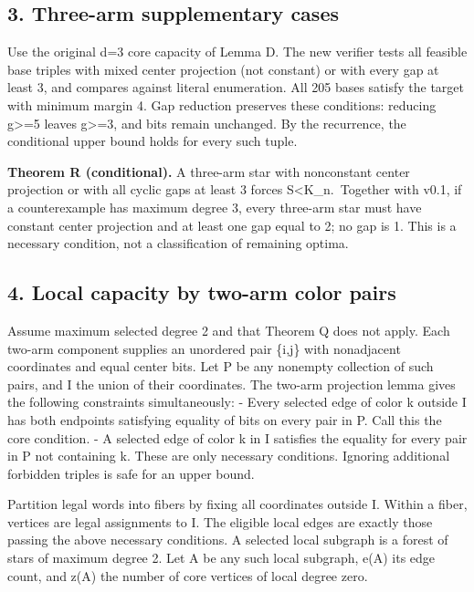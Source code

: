 \documentclass[
  10pt,
]{article}
\begin{document}
\subsection{3. Three-arm supplementary
cases}\label{three-arm-supplementary-cases}

Use the original d=3 core capacity of Lemma D. The new verifier tests
all feasible base triples with mixed center projection (not constant) or
with every gap at least 3, and compares against literal enumeration. All
205 bases satisfy the target with minimum margin 4. Gap reduction
preserves these conditions: reducing g\textgreater=5 leaves
g\textgreater=3, and bits remain unchanged. By the recurrence, the
conditional upper bound holds for every such tuple.

\textbf{Theorem R (conditional).} A three-arm star with nonconstant
center projection or with all cyclic gaps at least 3 forces
\textbar S\textbar\textless K\_n.~Together with v0.1, if a
counterexample has maximum degree 3, every three-arm star must have
constant center projection and at least one gap equal to 2; no gap is 1.
This is a necessary condition, not a classification of remaining optima.

\subsection{4. Local capacity by two-arm color
pairs}\label{local-capacity-by-two-arm-color-pairs}

Assume maximum selected degree 2 and that Theorem Q does not apply. Each
two-arm component supplies an unordered pair \{i,j\} with nonadjacent
coordinates and equal center bits. Let P be any nonempty collection of
such pairs, and I the union of their coordinates. The two-arm projection
lemma gives the following constraints simultaneously: - Every selected
edge of color k outside I has both endpoints satisfying equality of bits
on every pair in P. Call this the core condition. - A selected edge of
color k in I satisfies the equality for every pair in P not containing
k. These are only necessary conditions. Ignoring additional forbidden
triples is safe for an upper bound.

Partition legal words into fibers by fixing all coordinates outside I.
Within a fiber, vertices are legal assignments to I. The eligible local
edges are exactly those passing the above necessary conditions. A
selected local subgraph is a forest of stars of maximum degree 2. Let A
be any such local subgraph, e(A) its edge count, and z(A) the number of
core vertices of local degree zero.
\end{document}
